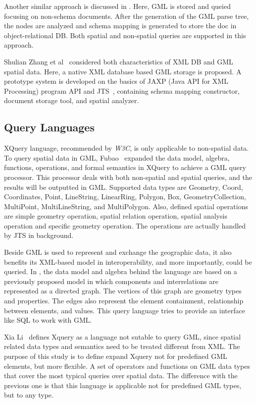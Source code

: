 \documentclass[a4paper,12pt]{article}
\begin{document}
Another similar approach is discussed in \cite{Zhu2011}. Here, GML is stored and queied 
focusing on non-schema documents. After the generation of the GML parse tree,
the nodes are analyzed and schema mapping is generated to store the doc in object-relational DB. 
Both spatial and non-spatial queries are supported in this approach.

Shulian Zhang et al~\cite{Zhang2008} considered both characteristics of XML DB 
and GML spatial data. Here, a native XML database based GML storage is proposed. 
A prototype system is developed on the basics of JAXP (Java API for XML Processing) program API 
and JTS~\cite{jts}, containing schema mapping constructor, document storage tool, 
and spatial analyzer.

\subsection{Query Languages}
\label{query}
XQuery language, recommended by \emph{W3C}, is only 
applicable to non-spatial data. To query spatial data in GML,
Fubao~\cite{Fubao2010} expanded the data model, algebra, functions, operations, 
and formal semantics in XQuery to achieve a GML query processor.
This processor deals with both non-spatial and spatial queries, 
and the results will be outputted in GML.
Supported data types are  Geometry, Coord, Coordinates, Point, LineString, LinearRing, 
Polygon, Box, GeometryCollection, MultiPoint, MultiLineString, and MultiPolygon.
Also, defined spatial operations are simple geometry operation, spatial relation 
operation, spatial analysis operation and specific geometry operation.
The operations are actually handled by JTS in background.

Beside GML is used to represent and exchange 
the geographic data, it also benefits its XML-based model in interoperability, 
and more importantly, could be queried. In \cite{corcoles2001}, the data model 
and algebra behind the language are based on a previously proposed model 
in which components and interrelations are represented as a directed graph. 
The vertices of this graph are geometry types and properties. The edges also
represent the element containment, relationship between elements, and values. 
This query language tries to provide an interface like SQL to work with GML.

Xia Li~\cite{Lisa2006} defines Xquery as a language  not sutable to query GML, 
since spatial related data types and semantics need to be treated different from XML. 
The purpose of this study is to define expand Xquery not for predefined GML elements, 
but more flexible.  A set of operators and functions on GML data types that cover 
the most typical queries over spatial data. The difference with the previous one is 
that this language is applicable not for predefined GML types, but to any type.
\end{document}
